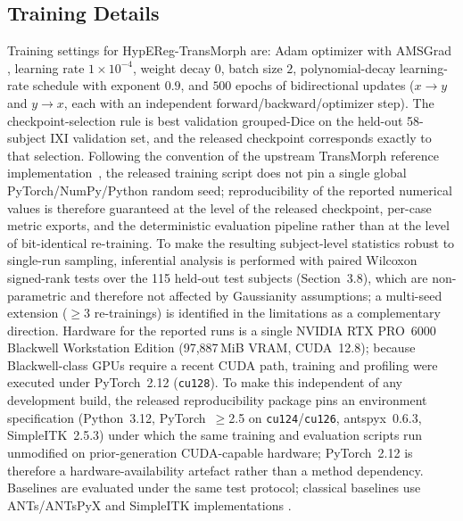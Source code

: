 \documentclass[jimaging,article,submit,pdftex,moreauthors]{Definitions/mdpi}
\begin{document}
\subsection{Training Details}
Training settings for HypEReg-TransMorph are: Adam optimizer with AMSGrad \cite{kingma2014adam,reddi2018amsgrad}, learning rate $1\times10^{-4}$, weight decay $0$, batch size $2$, polynomial-decay learning-rate schedule with exponent $0.9$, and $500$ epochs of bidirectional updates ($x\!\to\! y$ and $y\!\to\! x$, each with an independent forward/backward/optimizer step). The checkpoint-selection rule is best validation grouped-Dice on the held-out 58-subject IXI validation set, and the released checkpoint corresponds exactly to that selection. Following the convention of the upstream TransMorph reference implementation~\cite{chen2022transmorph}, the released training script does not pin a single global PyTorch/NumPy/Python random seed; reproducibility of the reported numerical values is therefore guaranteed at the level of the released checkpoint, per-case metric exports, and the deterministic evaluation pipeline rather than at the level of bit-identical re-training. To make the resulting subject-level statistics robust to single-run sampling, inferential analysis is performed with paired Wilcoxon signed-rank tests over the 115 held-out test subjects (Section~3.8), which are non-parametric and therefore not affected by Gaussianity assumptions; a multi-seed extension ($\geq 3$ re-trainings) is identified in the limitations as a complementary direction. Hardware for the reported runs is a single NVIDIA RTX PRO~6000 Blackwell Workstation Edition (97{,}887\,MiB VRAM, CUDA~12.8); because Blackwell-class GPUs require a recent CUDA path, training and profiling were executed under PyTorch~2.12 (\texttt{cu128}). To make this independent of any development build, the released reproducibility package pins an environment specification (Python~3.12, PyTorch~$\geq$2.5 on \texttt{cu124}/\texttt{cu126}, antspyx~0.6.3, SimpleITK~2.5.3) under which the same training and evaluation scripts run unmodified on prior-generation CUDA-capable hardware; PyTorch~2.12 is therefore a hardware-availability artefact rather than a method dependency. Baselines are evaluated under the same test protocol; classical baselines use ANTs/ANTsPyX and SimpleITK implementations \cite{avants2008ants,antspyx2024,simpleitk2013}.
\end{document}
